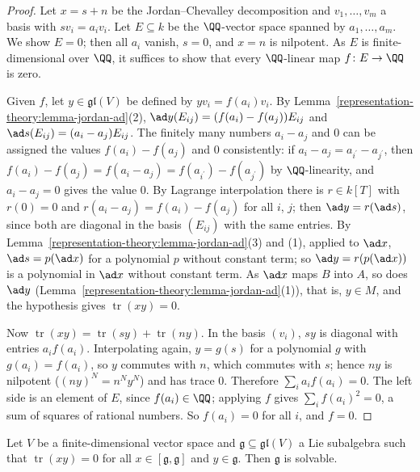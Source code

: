 \begin{proof}
Let $x = s + n$ be the Jordan--Chevalley decomposition and $v_1, \ldots, v_m$ a basis with $sv_i = a_iv_i$. Let $E \subseteq k$ be the $\QQ$-vector space spanned by
$a_1, \ldots, a_m$. We show $E = 0$; then all $a_i$ vanish, $s = 0$, and $x = n$ is nilpotent. As $E$ is finite-dimensional over $\QQ$, it suffices to show that every
$\QQ$-linear map $f \colon E \to \QQ$ is zero.

Given $f$, let $y \in \mathfrak{gl}(V)$ be defined by $yv_i = f(a_i)v_i$. By Lemma~\ref{representation-theory:lemma-jordan-ad}(2), $\ad y(E_{ij}) = (f(a_i) - f(a_j))E_{ij}$
and $\ad s(E_{ij}) = (a_i - a_j)E_{ij}$. The finitely many numbers $a_i - a_j$ and $0$ can be assigned the values $f(a_i) - f(a_j)$ and $0$ consistently: if
$a_i - a_j = a_{i^{\prime}} - a_{j^{\prime}}$, then $f(a_i) - f(a_j) = f(a_i - a_j) = f(a_{i^{\prime}}) - f(a_{j^{\prime}})$ by $\QQ$-linearity, and $a_i - a_j = 0$ gives
the value $0$. By Lagrange interpolation there is $r \in k[T]$ with $r(0) = 0$ and $r(a_i - a_j) = f(a_i) - f(a_j)$ for all $i$, $j$; then $\ad y = r(\ad s)$, since both are
diagonal in the basis $(E_{ij})$ with the same entries. By Lemma~\ref{representation-theory:lemma-jordan-ad}(3) and (1), applied to $\ad x$, $\ad s = p(\ad x)$ for a polynomial
$p$ without constant term; so $\ad y = r(p(\ad x))$ is a polynomial in $\ad x$ without constant term. As $\ad x$ maps $B$ into $A$, so does $\ad y$
(Lemma~\ref{representation-theory:lemma-jordan-ad}(1)), that is, $y \in M$, and the hypothesis gives $\operatorname{tr}(xy) = 0$.

Now $\operatorname{tr}(xy) = \operatorname{tr}(sy) + \operatorname{tr}(ny)$. In the basis $(v_i)$, $sy$ is diagonal with entries $a_if(a_i)$. Interpolating again, $y = g(s)$ for a
polynomial $g$ with $g(a_i) = f(a_i)$, so $y$ commutes with $n$, which commutes with $s$; hence $ny$ is nilpotent ($(ny)^N = n^Ny^N$) and has trace $0$. Therefore
$\sum_ia_if(a_i) = 0$. The left side is an element of $E$, since $f(a_i) \in \QQ$; applying $f$ gives $\sum_if(a_i)^2 = 0$, a sum of squares of rational numbers. So
$f(a_i) = 0$ for all $i$, and $f = 0$.
\end{proof}

\begin{theorem}\label{representation-theory:theorem-cartan-criterion}
Let $V$ be a finite-dimensional vector space and $\mathfrak{g} \subseteq \mathfrak{gl}(V)$ a Lie subalgebra such that $\operatorname{tr}(xy) = 0$ for all
$x \in [\mathfrak{g}, \mathfrak{g}]$ and $y \in \mathfrak{g}$. Then $\mathfrak{g}$ is solvable.
\end{theorem}

